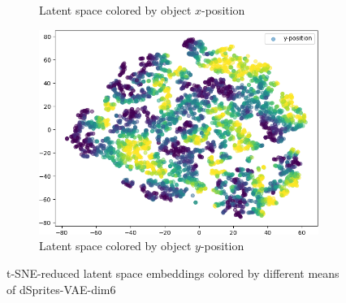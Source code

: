 \begin{figure}
\begin{adjustbox}{valign=T}
\begin{subfigure}{.19\textwidth}
            \caption{Latent space colored by object $x$-position}
        \end{subfigure}
    \end{adjustbox}
    \hfill
    \begin{adjustbox}{valign=T}
        \begin{subfigure}{.19\textwidth}
            \includegraphics[width=\textwidth]{images/latent_spaces/dsprites/vae/embeddings_mu_4.png}
            \caption{Latent space colored by object $y$-position}
        \end{subfigure}
    \end{adjustbox}
    \caption[dsprites-VAE-dim6 - Latent Space]{\ac{t-SNE}-reduced latent space embeddings colored by different means of dSprites-\ac{VAE}-dim6}
    \label{fig:vae_latent_space_dsprites}
\end{figure}

